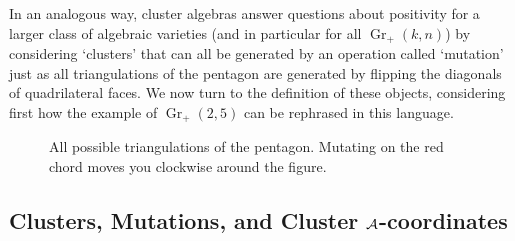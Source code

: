 \documentclass[12pt]{article}
\DeclareMathOperator{\Gr}{Gr}
\def\drawLabeledPentagon{
\coordinate (P1) at (90:1);
\coordinate (P2) at (18:1);
\coordinate (P3) at (306:1);
\coordinate (P4) at (234:1);
\coordinate (P5) at (162:1);
\draw[white,fill=white] (0,0) circle (1cm);
\draw (P1) -- (P2) -- (P3) -- (P4) -- (P5) -- cycle;
\draw (0,1.2) node {1};
\draw (.9,.3) node[anchor=west] {2};
\draw (.5,-.9) node[anchor=west] {3};
\draw (-.5,-.9) node[anchor=east] {4};
\draw (-.9,.3) node[anchor=east] {5};
}
\begin{document}
In an analogous way, cluster algebras answer questions about positivity for a larger class of algebraic varieties (and in particular for all $\Gr_+(k,n)$) by considering `clusters' that can all be generated by an operation called `mutation' just as all triangulations of the pentagon are generated by flipping the diagonals of quadrilateral faces. We now turn to the definition of these objects, considering first how the example of $\Gr_+(2,5)$ can be rephrased in this language.

\begin{figure}[t]   \centering
  \caption{All possible triangulations of the pentagon. Mutating on the red chord moves you clockwise around the figure.}
\label{fig:pent_triangulations}
\end{figure}


\subsection{Clusters, Mutations, and Cluster ${\cal A}$-coordinates}
\end{document}
